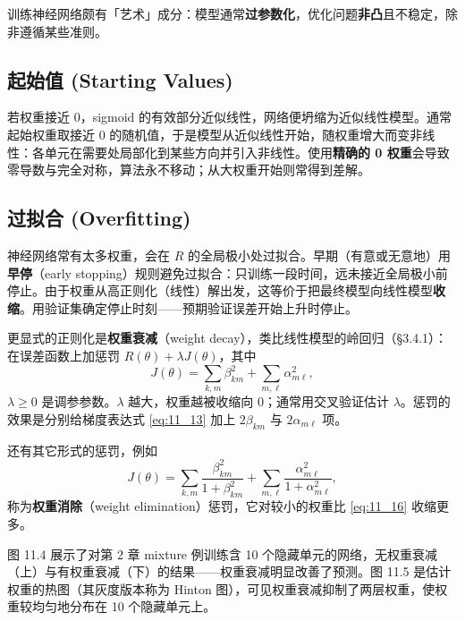 训练神经网络颇有「艺术」成分：模型通常\textbf{过参数化}，优化问题\textbf{非凸}且不稳定，除非遵循某些准则。

\subsection{起始值 (Starting Values)}

\begin{remark}[从小权重随机起始]
若权重接近 0，sigmoid 的有效部分近似线性，网络便坍缩为近似线性模型。通常起始权重取接近 0 的随机值，于是模型从近似线性开始，随权重增大而变非线性：各单元在需要处局部化到某些方向并引入非线性。使用\textbf{精确的 0 权重}会导致零导数与完全对称，算法永不移动；从大权重开始则常得到差解。
\end{remark}

\subsection{过拟合 (Overfitting)}

神经网络常有太多权重，会在 $R$ 的全局极小处过拟合。早期（有意或无意地）用\textbf{早停}（early stopping）规则避免过拟合：只训练一段时间，远未接近全局极小前停止。由于权重从高正则化（线性）解出发，这等价于把最终模型向线性模型\textbf{收缩}。用验证集确定停止时刻——预期验证误差开始上升时停止。

更显式的正则化是\textbf{权重衰减}（weight decay），类比线性模型的岭回归（§3.4.1）：在误差函数上加惩罚 $R(\theta) + \lambda J(\theta)$，其中
\begin{equation}
J(\theta) = \sum_{k,m} \beta_{km}^2 + \sum_{m,\ell} \alpha_{m\ell}^2, \label{eq:11_16}
\end{equation}
$\lambda \ge 0$ 是调参参数。$\lambda$ 越大，权重越被收缩向 0；通常用交叉验证估计 $\lambda$。惩罚的效果是分别给梯度表达式 \ref{eq:11_13} 加上 $2\beta_{km}$ 与 $2\alpha_{m\ell}$ 项。

还有其它形式的惩罚，例如
\begin{equation}
J(\theta) = \sum_{k,m} \frac{\beta_{km}^2}{1+\beta_{km}^2} + \sum_{m,\ell} \frac{\alpha_{m\ell}^2}{1+\alpha_{m\ell}^2}, \label{eq:11_17}
\end{equation}
称为\textbf{权重消除}（weight elimination）惩罚，它对较小的权重比 \ref{eq:11_16} 收缩更多。

\begin{remark}[图 11.4 / 11.5]
图 11.4 展示了对第 2 章 mixture 例训练含 10 个隐藏单元的网络，无权重衰减（上）与有权重衰减（下）的结果——权重衰减明显改善了预测。图 11.5 是估计权重的热图（其灰度版本称为 Hinton 图），可见权重衰减抑制了两层权重，使权重较均匀地分布在 10 个隐藏单元上。
\end{remark}

